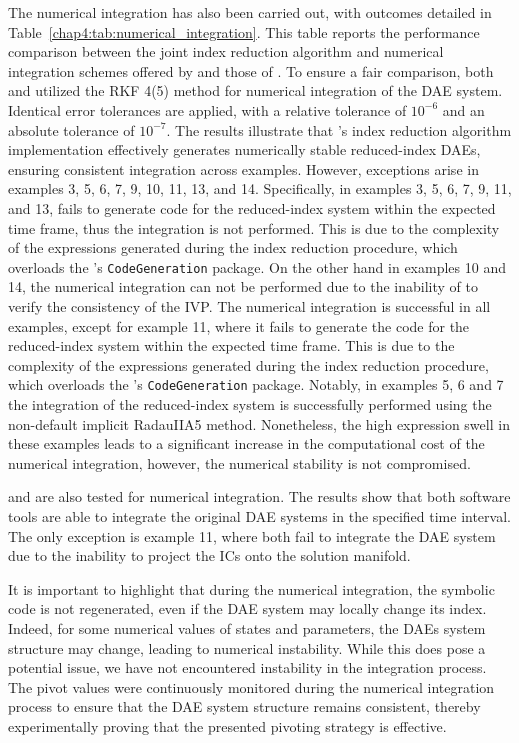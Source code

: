 The numerical integration has also been carried out, with outcomes detailed in Table~\ref{chap4:tab:numerical_integration}. This table reports the performance comparison between the joint index reduction algorithm and numerical integration schemes offered by \Maple{} and those of \Indigo{}. To ensure a fair comparison, both \Maple{} and \Indigo{} utilized the \ac{RKF} 4(5) method for numerical integration of the \ac{DAE} system. Identical error tolerances are applied, with a relative tolerance of $10^{-6}$ and an absolute tolerance of $10^{-7}$. The results illustrate that \Indigo{}'s index reduction algorithm implementation effectively generates numerically stable reduced-index \acp{DAE}, ensuring consistent integration across examples. However, exceptions arise in examples 3, 5, 6, 7, 9, 10, 11, 13, and 14. Specifically, in examples 3, 5, 6, 7, 9, 11, and 13, \Maple{} fails to generate code for the reduced-index system within the expected time frame, thus the integration is not performed. This is due to the complexity of the expressions generated during the index reduction procedure, which overloads the \Maple{}'s \texttt{CodeGeneration} package. On the other hand in examples 10 and 14, the numerical integration can not be performed due to the inability of \Maple{} to verify the consistency of the \ac{IVP}. The \Indigo{} numerical integration is successful in all examples, except for example 11, where it fails to generate the code for the reduced-index system within the expected time frame. This is due to the complexity of the expressions generated during the index reduction procedure, which overloads the \Indigo{}'s \texttt{CodeGeneration} package. Notably, in examples 5, 6 and 7 the integration of the reduced-index system is successfully performed using the non-default implicit RadauIIA5 method. Nonetheless, the high expression swell in these examples leads to a significant increase in the computational cost of the numerical integration, however, the numerical stability is not compromised.

\Mathematica{} and \Matlab{} are also tested for numerical integration. The results show that both software tools are able to integrate the original \ac{DAE} systems in the specified time interval. The only exception is example 11, where both fail to integrate the \ac{DAE} system due to the inability to project the \acp{IC} onto the solution manifold.

It is important to highlight that during the numerical integration, the symbolic code is not regenerated, even if the \ac{DAE} system may locally change its index. Indeed, for some numerical values of states and parameters, the \acp{DAE} system structure may change, leading to numerical instability. While this does pose a potential issue, we have not encountered instability in the integration process. The pivot values were continuously monitored during the numerical integration process to ensure that the \ac{DAE} system structure remains consistent, thereby experimentally proving that the presented pivoting strategy is effective.



